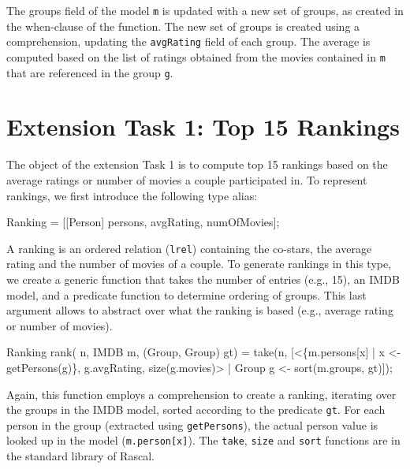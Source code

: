 \documentclass[submission,copyright,creativecommons]{eptcs}
\begin{document}
The groups field of the model \texttt{m} is updated with a new set of groups, as created in the when-clause of the function. 
The new set of groups is created using a comprehension, updating the \texttt{avgRating} field of each group. 
The average is computed based on the list of ratings obtained from the movies contained in \texttt{m} that are referenced in the group \texttt{g}. 

\section{Extension Task 1: Top 15 Rankings}

The object of the extension Task 1 is to compute top 15 rankings based on the average ratings or number of movies a couple participated in. 
To represent rankings, we first introduce the following type alias:

\begin{rascal}
 Ranking = [[Person] persons,  avgRating,  numOfMovies]; 
\end{rascal}
\vspace*{-.4cm}

A ranking is an ordered relation (\texttt{lrel}) containing the co-stars, the average rating and the number of movies of a couple. 
To generate rankings in this type, we create a generic function that takes the number of entries (e.g., 15), an IMDB model, and a predicate function to determine ordering of groups. This last argument allows to abstract over what the ranking is based (e.g., average rating or number of movies). 

\begin{rascal}
Ranking rank( n, IMDB m, (Group, Group) gt) =
    take(n, 
       {}[\textless{}\{{}m.persons{}[x] | x \textless{}- getPersons(g)\}{}, g.avgRating, size(g.movies)\textgreater{} 
            | Group g \textless{}- sort(m.groups, gt)]);
\end{rascal}    

Again, this function employs a comprehension to create a ranking, iterating over the groups in the IMDB model, sorted according to the predicate \texttt{gt}. For each person in the group (extracted using \texttt{getPersons}), the actual person value is looked up in the model (\texttt{m.person[x]}). The \texttt{take}, \texttt{size} and \texttt{sort} functions are in the standard library of Rascal.  
\end{document}
